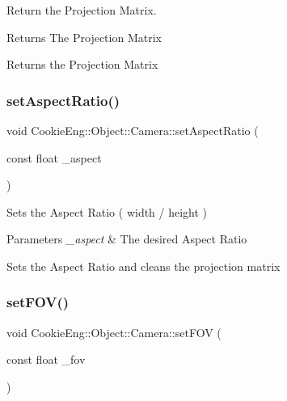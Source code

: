 Return the Projection Matrix. 

\begin{DoxyReturn}{Returns}
The Projection Matrix
\end{DoxyReturn}
Returns the Projection Matrix \mbox{\label{class_cookie_eng_1_1_object_1_1_camera_a2a86235e64f591e8c812f1d69be30a94}} 
\subsubsection{\texorpdfstring{set\+Aspect\+Ratio()}{setAspectRatio()}}
{\footnotesize\ttfamily void Cookie\+Eng\+::\+Object\+::\+Camera\+::set\+Aspect\+Ratio (\begin{DoxyParamCaption}\item[{const float}]{\+\_\+aspect }\end{DoxyParamCaption})\hspace{0.3cm}{\ttfamily [inline]}}



Sets the Aspect Ratio ( width / height ) 


\begin{DoxyParams}{Parameters}
{\em \+\_\+aspect} & The desired Aspect Ratio\\
\hline
\end{DoxyParams}
Sets the Aspect Ratio and cleans the projection matrix \mbox{\label{class_cookie_eng_1_1_object_1_1_camera_aef44a3e6cef1540be7e8bcb977dddd78}} 
\subsubsection{\texorpdfstring{set\+F\+O\+V()}{setFOV()}}
{\footnotesize\ttfamily void Cookie\+Eng\+::\+Object\+::\+Camera\+::set\+F\+OV (\begin{DoxyParamCaption}\item[{const float}]{\+\_\+fov }\end{DoxyParamCaption})\hspace{0.3cm}{\ttfamily [inline]}}



